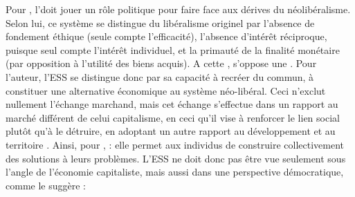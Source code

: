             Pour \textcite{defalvard2016leconomie}, l'\ess doit jouer un rôle politique pour faire face aux dérives du néolibéralisme. Selon lui, ce système se distingue du libéralisme originel par l’absence de fondement éthique (seule compte l’efficacité), l’absence d’intérêt réciproque, puisque seul compte l’intérêt individuel, et la primauté de la finalité monétaire (par opposition à l’utilité des biens acquis). A cette , s’oppose une . Pour l’auteur, l’ESS se distingue donc par sa capacité à recréer du commun, à constituer une alternative économique  au système néo-libéral. Ceci n’exclut nullement l’échange marchand, mais cet échange s’effectue dans un rapport au marché différent de celui capitalisme, en ceci qu’il vise à renforcer le lien social plutôt qu’à le détruire, en adoptant un autre rapport au  développement et au territoire \parencite{draperi2015leconomie}.  Ainsi, pour \textcite[][p.64]{laville2016economie},  : elle permet aux individus de construire collectivement des solutions à leurs problèmes. L’ESS ne doit donc pas être vue seulement sous l’angle de l’économie capitaliste, mais aussi dans une perspective démocratique, comme le suggère \textcite{eikenberry2009refusing} :
            \begin{quotation}
            \end{quotation}

